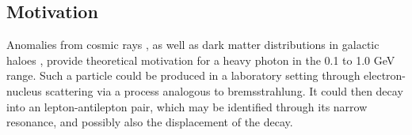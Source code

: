 \documentclass[b1]{sciposter}
\begin{document}
\begin{multicols}{3}
	\section*{Motivation}
Anomalies from cosmic rays
\cite{Finkbeiner:2010sm}, as well as dark matter distributions in galactic haloes \cite{Vogelsberger:2012ku}, provide theoretical motivation for a heavy photon in the 0.1 to 1.0 GeV range.  Such a particle could be produced in a laboratory setting through electron-nucleus scattering via a process analogous to bremsstrahlung.  It could then decay into an lepton-antilepton pair, which may be identified through its narrow resonance, and possibly also the displacement of the decay.




\end{multicols}
\end{document}
